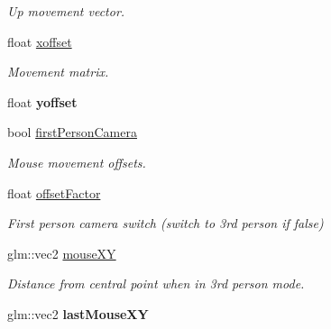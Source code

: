 \begin{DoxyCompactItemize}
\begin{DoxyCompactList}\small\item\em Up movement vector. \end{DoxyCompactList}\item 
\hypertarget{class_camera_component_a385f35e4c5d616580e0bd4ded5c4653f}{float \hyperlink{class_camera_component_a385f35e4c5d616580e0bd4ded5c4653f}{xoffset}}\label{class_camera_component_a385f35e4c5d616580e0bd4ded5c4653f}

\begin{DoxyCompactList}\small\item\em Movement matrix. \end{DoxyCompactList}\item 
\hypertarget{class_camera_component_aac7aad40b74b70920b8b5d214550fe91}{float {\bfseries yoffset}}\label{class_camera_component_aac7aad40b74b70920b8b5d214550fe91}

\item 
\hypertarget{class_camera_component_ac1d3fbcc4d2d4a0f079339a238798cd8}{bool \hyperlink{class_camera_component_ac1d3fbcc4d2d4a0f079339a238798cd8}{first\+Person\+Camera}}\label{class_camera_component_ac1d3fbcc4d2d4a0f079339a238798cd8}

\begin{DoxyCompactList}\small\item\em Mouse movement offsets. \end{DoxyCompactList}\item 
\hypertarget{class_camera_component_a8d1632f720f6478ceb2c146aee4a35b1}{float \hyperlink{class_camera_component_a8d1632f720f6478ceb2c146aee4a35b1}{offset\+Factor}}\label{class_camera_component_a8d1632f720f6478ceb2c146aee4a35b1}

\begin{DoxyCompactList}\small\item\em First person camera switch (switch to 3rd person if false) \end{DoxyCompactList}\item 
\hypertarget{class_camera_component_a92d8a306e8b05c1bde2deecb4ae5e1f9}{glm\+::vec2 \hyperlink{class_camera_component_a92d8a306e8b05c1bde2deecb4ae5e1f9}{mouse\+X\+Y}}\label{class_camera_component_a92d8a306e8b05c1bde2deecb4ae5e1f9}

\begin{DoxyCompactList}\small\item\em Distance from central point when in 3rd person mode. \end{DoxyCompactList}\item 
\hypertarget{class_camera_component_aef5b26e5e9b68eab4efec97b74c11b13}{glm\+::vec2 {\bfseries last\+Mouse\+X\+Y}}\label{class_camera_component_aef5b26e5e9b68eab4efec97b74c11b13}


\end{DoxyCompactItemize}
